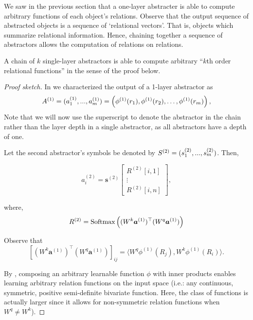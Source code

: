 We saw in the previous section that a one-layer abstracter is able to compute arbitrary functions  of each object's relations. Observe that the output sequence of abstracted objects is a sequence of `relational vectors'. That is, objects which summarize relational information. Hence, chaining together a sequence of  abstractors allows the computation of relations on relations.

\begin{lemma}
	\label{lemma:function_class_composed_abstractors}
	A chain of $k$ single-layer  abstractors is able to compute arbitrary ``$k$th order relational functions'' in the sense of the proof below.
\end{lemma}
\begin{proof}[Proof sketch]
	In  we characterized the output of a 1-layer abstractor as
	\begin{equation*}
		A^{(1)} = (a_1^{(1)}, ..., a_\m^{(1)}) = \left(\phi^{(1)}(r_1), \phi^{(1)}(r_2), \ldots, \phi^{(1)}(r_\m)\right),
	\end{equation*}
	Note that we will now use the superscript to denote the abstractor in the chain rather than the layer depth in a single  abstractor, as all  abstractors have a depth of one.

	Let the second abstractor's symbols be denoted by $S^{(2)} = (s_1^{(2)}, ..., s_m^{(2)})$. Then,

	\begin{equation*}
		a_i^{(2)} = \boldsymbol{s}^{(2)} \begin{bmatrix}R^{(2)}[i,1] \\ \vdots \\ R^{(2)}[i,n]\end{bmatrix},
	\end{equation*}

	where,
	\begin{equation*}
		R^{(2)} = \Softmax\left((W^k \boldsymbol{a}^{(1)})^\top (W^q \boldsymbol{a}^{(1)})\right)
	\end{equation*}

	Observe that
	\begin{equation*}
		\left[(W^k \boldsymbol{a}^{(1)})^\top (W^q \boldsymbol{a}^{(1)})\right]_{ij} = \langle W^q \phi^{(1)}(R_j), W^k \phi^{(1)}(R_i) \rangle.
	\end{equation*}

	By , composing an arbitrary learnable function $\phi$ with inner products enables learning arbitrary relation functions on the input space (i.e.: any continuous, symmetric, positive semi-definite bivariate function. Here, the class of functions is actually larger since it allows for non-symmetric relation functions when $W^q \neq W^k$).


\end{proof}
